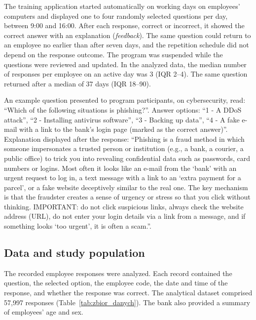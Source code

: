 \documentclass[11pt]{article}
\newcommand{\DailyQOne}{2}
\newcommand{\DailyQThree}{4}
\newcommand{\NResponses}{57{,}997}
\newcommand{\GapMedian}{37}
\newcommand{\GapQOne}{18}
\newcommand{\GapQThree}{90}
\newcommand{\DailyMedian}{3}
\begin{document}
The training application started automatically on working days on employees' computers and displayed
one to four randomly selected questions per day, between 9:00 and 16:00. After each response, correct
or incorrect, it showed the correct answer with an explanation (\emph{feedback}). The same question
could return to an employee no earlier than after seven days, and the repetition schedule did not
depend on the response outcome. The program was suspended while the questions were reviewed and
updated. In the analyzed data, the median number of responses per employee on an active day was
\DailyMedian{} (IQR \DailyQOne--\DailyQThree). The same question returned after a median of
\GapMedian{} days (IQR \GapQOne--\GapQThree).

An example question presented to program participants, on cybersecurity, read:
``Which of the following situations is phishing?''. Answer options:
``1 - A DDoS attack'',
``2 - Installing antivirus software'',
``3 - Backing up data'',
``4 - A fake e-mail with a link to the bank's login page (marked as the correct answer)''.
Explanation displayed after the response:
``Phishing is a fraud method in which someone impersonates a trusted person or institution (e.g., a bank, a courier, a public office) to trick you into revealing confidential data such as passwords, card numbers or logins. Most often it looks like an e-mail from the `bank' with an urgent request to log in, a text message with a link to an `extra payment for a parcel', or a fake website deceptively similar to the real one. The key mechanism is that the fraudster creates a sense of urgency or stress so that you click without thinking. IMPORTANT: do not click suspicious links, always check the website address (URL), do not enter your login details via a link from a message, and if something looks `too urgent', it is often a scam.''.

\subsection{Data and study population}
\label{sec:dane}
The recorded employee responses were analyzed. Each record contained the question, the selected
option, the employee code, the date and time of the response, and whether the response was correct.
The analytical dataset comprised \NResponses{} responses
(Table~\ref{tab:zbior_danych}). The bank also provided a summary of employees' age and sex.
\end{document}
